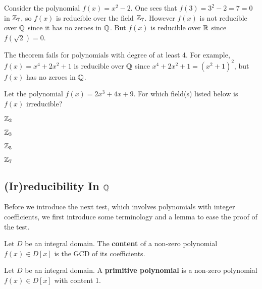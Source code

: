 \begin{example}
    Consider the polynomial $f(x) = x^2 - 2$. One sees that $f(3) = 3^2 - 2 = 7 = 0$ in $\mathbb{Z}_7$, so $f(x)$ is reducible over the field $\mathbb{Z}_7$. However $f(x)$ is not reducible over $\mathbb{Q}$ since it has no zeroes in $\mathbb{Q}$. But $f(x)$ is reducible over $\mathbb{R}$ since $f(\sqrt2) = 0$.
\end{example}

\begin{example}
    The theorem fails for polynomials with degree of at least 4. For example, $f(x) = x^4 + 2x^2 + 1$ is reducible over $\mathbb{Q}$ since $x^4 + 2x^2 + 1 = (x^2+1)^2$, but $f(x)$ has no zeroes in $\mathbb{Q}$.
\end{example}

\begin{exercise}
    Let the polynomial $f(x) = 2x^3 + 4x + 9$. For which field(s) listed below is $f(x)$ irreducible?
    \begin{multicols}{4}
        \begin{partquestions}{\alph*}
            \item $\mathbb{Z}_2$
            \item $\mathbb{Z}_3$
            \item $\mathbb{Z}_5$
            \item $\mathbb{Z}_7$
        \end{partquestions} 
    \end{multicols}
\end{exercise}

\subsection{(Ir)reducibility In $\mathbb{Q}$}
Before we introduce the next test, which involves polynomials with integer coefficients, we first introduce some terminology and a lemma to ease the proof of the test.

\begin{definition}
    Let $D$ be an integral domain. The \textbf{content} of a non-zero polynomial $f(x) \in D[x]$ is the GCD of its coefficients.
\end{definition}

\begin{definition}
    Let $D$ be an integral domain. A \textbf{primitive polynomial} is a non-zero polynomial $f(x) \in D[x]$ with content 1.
\end{definition}


